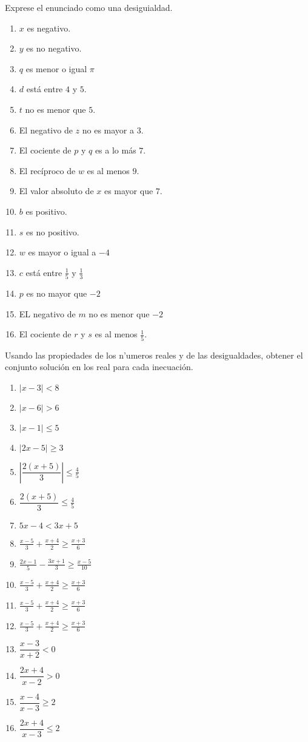 \documentclass[]{book}
\theoremstyle{definition}
\theoremstyle{definition}
\theoremstyle{definition}
\theoremstyle{remark}
\begin{document}
Exprese el enunciado como una desiguialdad.

\begin{enumerate}
	\item $x$ es negativo.
	\item $y$ es no negativo.
	\item $q$ es menor o igual $\pi$
	\item $d$ está entre $4$ y $5$.
	\item $t$ no es menor que $5$.
	\item El negativo de $z$ no es mayor a $3$.
	\item El cociente de $p$ y $q$ es a lo más $7$.
	\item El recíproco de $w$ es al menos $9$.
	\item El valor absoluto de $x$ es mayor que $7$.
	\item $b$ es positivo.
	\item $s$ es no positivo.
	\item $w$ es mayor o igual a $-4$
	\item $c$ está entre $\frac{1}{5}$ y $\frac{1}{3}$
	\item $p$ es no mayor que $-2$
	\item EL negativo de $m$ no es menor que $-2$
	\item El cociente de $r$ y $s$ es al menos $\frac{1}{5}$.
\end{enumerate}

Usando las propiedades de los n'umeros reales y de las desigualdades, obtener el conjunto solución en los real para cada inecuación.

\begin{enumerate}
	\item {\Large $\mid x-3\mid<8$}
	\item {\Large $\mid x-6\mid>6$}
	\item {\Large $\mid x-1\mid \leq 5$}
	\item {\Large $\mid2x-5\mid \geq 3$}
	\item $\left|  \dfrac{2(x+5)}{3} \right|  \leq \frac{4}{5}$
	\item {\Large $\dfrac{2(x+5)}{3}\leq \frac{4}{5}$}
	\item {\Large $5x-4<3x+5$}
	\item {\Large $\frac{x-5}{3}+\frac{x+4}{2}\geq \frac{x+3}{6}$}
	\item {\Large $\frac{2x-1}{5}-\frac{3x+1}{3}\geq \frac{x-5}{10}$}
	\item {\Large $\frac{x-5}{3}+\frac{x+4}{2}\geq \frac{x+3}{6}$}
	\item {\Large $\frac{x-5}{3}+\frac{x+4}{2}\geq \frac{x+3}{6}$}
	\item {\Large $\frac{x-5}{3}+\frac{x+4}{2}\geq \frac{x+3}{6}$}
	\item {\Large $\dfrac{x-3}{x+2} < 0$}
	\item {\Large $\dfrac{2x+4}{x-2} > 0$}
	\item {\Large $\dfrac{x-4}{x-3}\geq 2$}
	\item {\Large $\dfrac{2x+4}{x-3}\leq 2$}
\end{enumerate}
\end{document}
